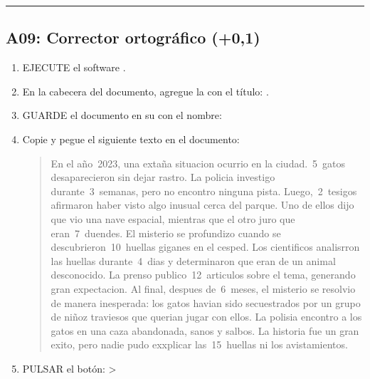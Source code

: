 \documentclass[letterpaper,10pt,spanish]{sphinxmanual}
\begin{document}
\bigskip\hrule\bigskip



\subsection{A09: Corrector ortográfico  (+0,1)}
\label{\detokenize{1_guias/10ofimatica/G1013:a09-corrector-ortografico-102-0-1}}\begin{enumerate}
%
\item {} 
\sphinxAtStartPar
EJECUTE el software .

\item {} 
\sphinxAtStartPar
En la cabecera del documento, agregue la  con el título: .

\item {} 
\sphinxAtStartPar
GUARDE el documento en su  con el nombre: 

\item {} 
\sphinxAtStartPar
Copie y pegue el siguiente texto en el documento:
\begin{quote}

\sphinxAtStartPar
En el año 2023, una extaña situacion ocurrio en la ciudad. 5 gatos desaparecieron sin dejar rastro. La policia investigo durante 3 semanas, pero no encontro ninguna pista. Luego, 2 tesigos afirmaron haber visto algo inusual cerca del parque. Uno de ellos dijo que vio una nave espacial, mientras que el otro juro que eran 7 duendes. El misterio se profundizo cuando se descubrieron 10 huellas giganes en el cesped. Los cientificos analisrron las huellas durante 4 dias y determinaron que eran de un animal desconocido. La prenso publico 12 articulos sobre el tema, generando gran expectacion. Al final, despues de 6 meses, el misterio se resolvio de manera inesperada: los gatos havian sido secuestrados por un grupo de niñoz traviesos que querian jugar con ellos. La polisia encontro a los gatos en una caza abandonada, sanos y salbos. La historia fue un gran exito, pero nadie pudo exxplicar las 15 huellas ni los avistamientos.
\end{quote}

\item {} 
\sphinxAtStartPar
PULSAR el botón:  > 



\end{enumerate}
\end{document}
